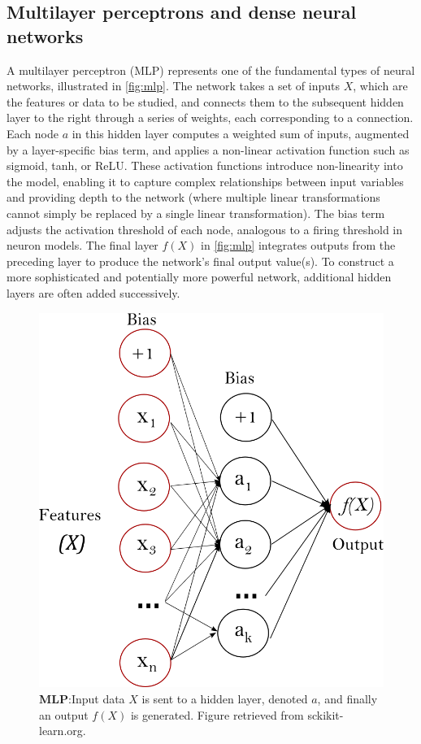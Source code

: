 

\subsection{Multilayer perceptrons and dense neural networks}

A multilayer perceptron (MLP) represents one of the fundamental types of neural networks, illustrated in \autoref{fig:mlp}. The network takes a set of inputs $X$, which are the features or data to be studied, and connects them to the subsequent hidden layer to the right through a series of weights, each corresponding to a connection. Each node $a$ in this hidden layer computes a weighted sum of inputs, augmented by a layer-specific bias term, and applies a non-linear activation function such as sigmoid, tanh, or ReLU. These activation functions introduce non-linearity into the model, enabling it to capture complex relationships between input variables and providing depth to the network (where multiple linear transformations cannot simply be replaced by a single linear transformation). The bias term adjusts the activation threshold of each node, analogous to a firing threshold in neuron models. The final layer $f(X)$ in \autoref{fig:mlp} integrates outputs from the preceding layer to produce the network's final output value(s). To construct a more sophisticated and potentially more powerful network, additional hidden layers are often added successively. 

\begin{figure}[H]
    \centering
    \includegraphics[width=0.5\linewidth]{latex//figures/multilayerperceptron_network.png}
    \caption{\textbf{MLP}:Input data $X$ is sent to a hidden layer, denoted $a$, and finally an output $f(X)$ is generated. Figure retrieved from sckikit-learn.org.}
    \label{fig:mlp}
\end{figure}

